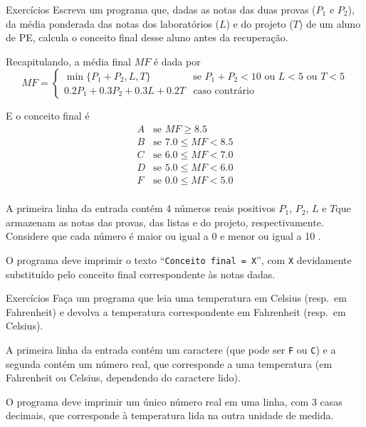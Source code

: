 \documentclass[handout]{beamer}
\begin{document}
\begin{frame}[fragile]{Exercícios}
\scriptsize
    Escreva um programa que, dadas as notas das duas provas ($P_1$ e $P_2$), da média ponderada das notas dos laboratórios ($L$) e do projeto ($T$) de um aluno de PE, calcula o conceito final desse aluno antes da recuperação.

    Recapitulando, a média final $MF$ é dada por
    $$MF = \left\{\begin{array}{rl}
        \min\{P_1+P_2, L, T\} & \mbox{se } P_1+P_2 < 10 \mbox{ ou } L < 5 \mbox{ ou } T < 5 \\
        0.2 P_1 + 0.3 P_2 + 0.3 L + 0.2 T & \mbox {caso contrário}
    \end{array}\right.$$

    E o conceito final é
    $$\begin{array}{rl}
    A & \mbox{se } MF \geq 8.5 \\
    B & \mbox{se } 7.0 \leq MF < 8.5 \\
    C & \mbox{se } 6.0 \leq MF < 7.0 \\
    D & \mbox{se } 5.0 \leq MF < 6.0 \\
    F & \mbox{se } 0.0 \leq MF < 5.0 \\
    \end{array}$$

    A primeira linha da entrada contém 4 números reais positivos $P_1$, $P_2$, $L$ e $T$que armazenam as notas das provas, das listas e do projeto, respectivamente. Considere que cada número é maior ou igual a 0 e menor ou igual a 10 .

    O programa deve imprimir o texto ``\texttt{Conceito final = X}'', com \texttt{X} devidamente substituído pelo conceito final correspondente às notas dadas.
\end{frame}

\begin{frame}[fragile]{Exercícios}
    Faça um programa que leia uma temperatura em Celsius (resp.\ em Fahrenheit)
    e devolva a temperatura correspondente em Fahrenheit (resp.\ em Celsius).

    A primeira linha da entrada contém um caractere (que pode ser \texttt{F} ou \texttt{C}) e a segunda contém um número real, que corresponde a uma temperatura (em Fahrenheit ou Celsius, dependendo do caractere lido).

    O programa deve imprimir um único número real em uma linha, com 3 casas decimais, que corresponde à temperatura lida na outra unidade de medida.
\end{frame}
\end{document}
